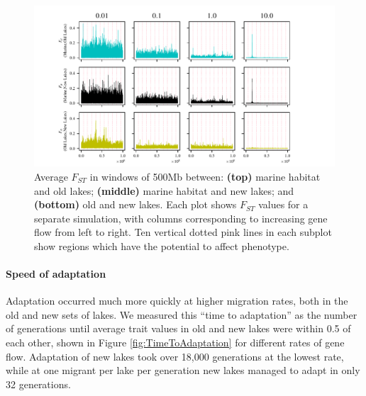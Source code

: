 \documentclass{article}
\begin{document}
\begin{figure}
	\begin{center}
        \includegraphics[width=\textwidth]{Final_Plots/Fst_Genome.pdf}
  		\caption{
		Average $F_{ST}$ in windows of 500Mb between:
        \textbf{(top)} marine habitat and old lakes;
        \textbf{(middle)} marine habitat and new lakes; and
        \textbf{(bottom)} old and new lakes.
        Each plot shows $F_{ST}$ values for a separate simulation,
        with columns corresponding to increasing gene flow from left to right.
		Ten vertical dotted pink lines in each subplot 
        show regions which have the potential to affect phenotype.
     } \label{fig:Fst}
	\end{center}
\end{figure}

\paragraph*{Speed of adaptation}
Adaptation occurred much more quickly
at higher migration rates,
both in the old and new sets of lakes.
We measured this ``time to adaptation''
as the number of generations until 
average trait values in old and new lakes were within 0.5 of each other,
shown in Figure \ref{fig:TimeToAdaptation} for different rates of gene flow.
Adaptation of new lakes took over 18,000 generations at the lowest rate,
while at one migrant per lake per generation
new lakes managed to adapt in only 32 generations. 
\end{document}
